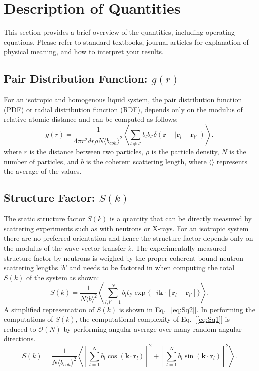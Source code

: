 \documentclass{article}
\begin{document}
\section{Description of Quantities}
This section provides a brief overview of the quantities, including operating equations. Please refer to standard textbooks, journal articles for explanation of physical meaning, and how to interpret your results.

\subsection{Pair Distribution Function: $g(r)$} \label{sec::gofr}
For an isotropic and homogenous liquid system, the pair distribution function (PDF) or radial distribution function (RDF), depends only on the modulus of relative atomic distance and can be computed as follows:
\begin{equation}
g(r) = \frac{1}{4\pi r^2dr\rho N \langle b_{coh}\rangle^2}\left\langle\sum\limits_{l\neq l'} b_lb_{l'}\delta(\mathbf{r}-|\mathbf{r}_l-\mathbf{r}_{l'}|)\right\rangle.
\end{equation}
where $r$ is the distance between two particles, $\rho$ is the particle density, $N$ is the number of particles, and $b$ is the coherent scattering length, where $\langle\rangle$ represents the average of the values.

\subsection{Structure Factor: $S(k)$} \label{sec::sofk}
The static structure factor $S(k)$ is a quantity that can be directly measured by scattering experiments such as with neutrons or X-rays. For an isotropic system there are no preferred orientation and hence the structure factor depends only on the modulus of the wave vector transfer $k$. The experimentally measured structure factor by neutrons is weighed by the proper coherent bound neutron scattering lengths `$b$' and needs to be factored in when computing the total $S(k)$ of the system as shown:
\begin{equation}
\label{eq:Sq1}
S(k) = \frac{1}{N\langle b\rangle^2}\left\langle\sum_{l,l'=1}^{N} b_lb_{l'}\exp{\{-i\mathbf{k}\cdot[\mathbf{r}_l - \mathbf{r}_{l'}]\}}\right\rangle.
\end{equation}
A simplified representation of $S(k)$ is shown in Eq.~[\ref{eq:Sq2}]. In performing the computations of $S(k)$, the computational complexity of Eq.~[\ref{eq:Sq1}] is reduced to $\mathcal{O}(N)$ by performing angular average over many random angular directions.
\begin{equation}
\label{eq:Sq2}
S(k) = \frac{1}{N\langle b_{coh}\rangle^2}\left\langle\left[\sum_{l=1}^{N} b_l\cos(\mathbf{k}\cdot\mathbf{r}_l)\right]^2+\left[\sum_{l=1}^{N} b_l\sin(\mathbf{k}\cdot\mathbf{r}_l)\right]^2\right\rangle.
\end{equation} 
\end{document}
